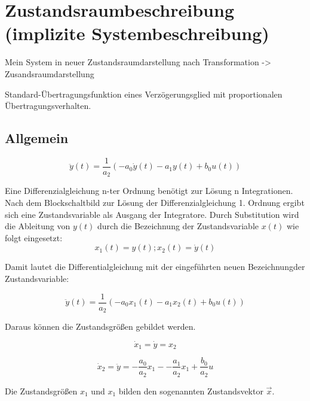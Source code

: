 \section{Zustandsraumbeschreibung (implizite Systembeschreibung)}
Mein System in neuer Zustandsraumdarstellung nach Transformation
-> Zusandsraumdarstellung



Standard-Übertragungsfunktion eines 
Verzögerungsglied mit proportionalen Übertragungsverhalten.
\subsection*{Allgemein}

\begin{equation*}
  \ddot y(t)= \frac{1}{a_2}(-a_0\dot y(t)-a_1 y(t) +b_0u(t))
\end{equation*}

Eine Differenzialgleichung n-ter Ordnung benötigt zur Lösung n Integrationen. 
Nach dem Blockschaltbild zur Lösung der Differenzialgleichung 1. Ordnung ergibt sich eine Zustandsvariable als Ausgang der Integratore. 
Durch Substitution wird die Ableitung von $y(t)$ durch die Bezeichnung der Zustandsvariable $x(t)$ wie folgt eingesetzt: 
\begin{equation*}
  x_1(t) = y(t); x_2(t) = \dot y(t)
\end{equation*}

Damit lautet die Differentialgleichung mit der eingeführten neuen Bezeichnungder Zustandsvariable:

\begin{equation*}
  \ddot y(t)= \frac{1}{a_2}(-a_0 x_1(t)-a_1 x_2(t) +b_0u(t))
\end{equation*}

Daraus können die Zustandsgrößen gebildet werden.

\begin{equation*}
  \dot x_1 = \dot y = x_2
\end{equation*}

\begin{equation*}
  \dot x_2= \ddot y = -\frac{a_0}{a_2}x_1--\frac{a_1}{a_2}x_1+\frac{b_0}{a_2}u
\end{equation*}

Die Zustandsgrößen $x_1$ und $x_1$ bilden den sogenannten Zustandsvektor $\vec x$.

